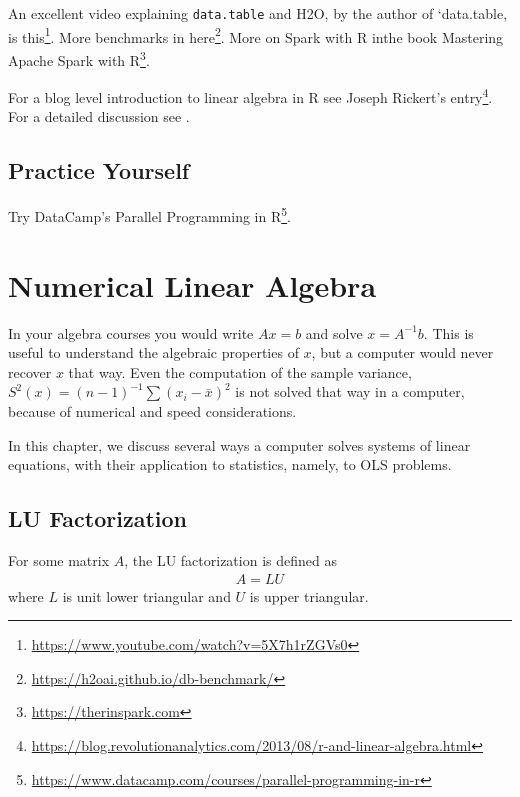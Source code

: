 \documentclass[]{book}
\renewcommand{\href}[2]{#2\footnote{\url{#1}}}
\theoremstyle{definition}
\theoremstyle{definition}
\theoremstyle{definition}
\theoremstyle{remark}
\let\BeginKnitrBlock\begin \let\EndKnitrBlock\end
\begin{document}
An excellent video explaining \texttt{data.table} and H2O, by the author of `data.table, is \href{https://www.youtube.com/watch?v=5X7h1rZGVs0}{this}.
More benchmarks in \href{https://h2oai.github.io/db-benchmark/}{here}.
More on Spark with R inthe book \href{https://therinspark.com}{Mastering Apache Spark with R}.

For a blog level introduction to linear algebra in R see \href{https://blog.revolutionanalytics.com/2013/08/r-and-linear-algebra.html}{Joseph Rickert's entry}.
For a detailed discussion see \citet{oancea2015accelerating}.

\hypertarget{practice-yourself-12}{%
\section{Practice Yourself}\label{practice-yourself-12}}

Try DataCamp's \href{https://www.datacamp.com/courses/parallel-programming-in-r}{Parallel Programming in R}.

\hypertarget{algebra}{%
\chapter{Numerical Linear Algebra}\label{algebra}}

In your algebra courses you would write \(Ax=b\) and solve \(x=A^{-1}b\).
This is useful to understand the algebraic properties of \(x\), but a computer would never recover \(x\) that way.
Even the computation of the sample variance, \(S^2(x)=(n-1)^{-1}\sum (x_i-\bar x )^2\) is not solved that way in a computer, because of numerical and speed considerations.

In this chapter, we discuss several ways a computer solves systems of linear equations, with their application to statistics, namely, to OLS problems.

\hypertarget{lu-factorization}{%
\section{LU Factorization}\label{lu-factorization}}

\BeginKnitrBlock{definition}[LU Factorization]
\protect\hypertarget{def:lu}{}{\label{def:lu} {} }For some matrix \(A\), the LU factorization is defined as
\begin{align}
 A = L U 
\end{align}
where \(L\) is unit lower triangular and \(U\) is upper triangular.
\EndKnitrBlock{definition}
\end{document}
